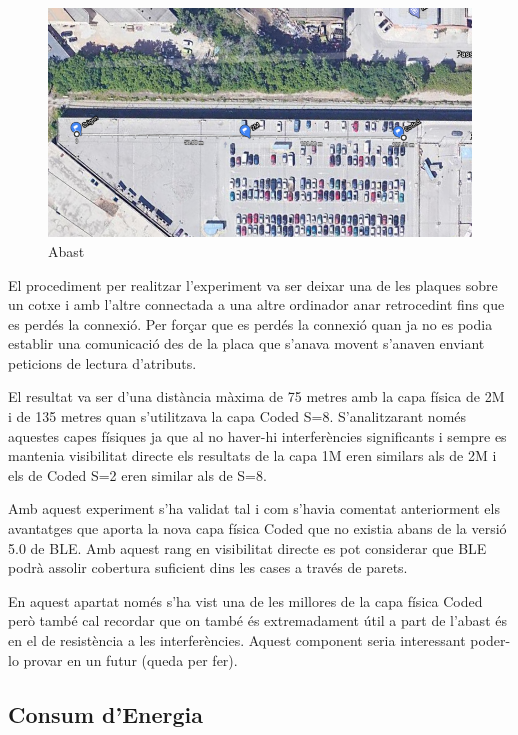 \begin{figure}[!h]
	\begin{center}
		\includegraphics[width=\textwidth]{./images/prova_abast.png}
		\caption{Abast}
	\end{center}
\end{figure}

El procediment per realitzar l'experiment va ser deixar una de les plaques sobre un cotxe i amb l'altre connectada a una altre ordinador anar retrocedint fins que es perdés la connexió.
Per forçar que es perdés la connexió quan ja no es podia establir una comunicació des de la placa que s'anava movent s'anaven enviant peticions de lectura d'atributs.

El resultat va ser d'una distància màxima de 75 metres amb la capa física de 2M i de 135 metres quan s'utilitzava la capa Coded S=8.
S'analitzarant només aquestes capes físiques ja que al no haver-hi interferències significants i sempre es mantenia visibilitat directe els resultats de la capa 1M eren similars als de 2M i els de Coded S=2 eren similar als de S=8.

Amb aquest experiment s'ha validat tal i com s'havia comentat anteriorment els avantatges que aporta la nova capa física Coded que no existia abans de la versió 5.0 de BLE.
Amb aquest rang en visibilitat directe es pot considerar que BLE podrà assolir cobertura suficient dins les cases a través de parets.

En aquest apartat només s'ha vist una de les millores de la capa física Coded però també cal recordar que on també és extremadament útil a part de l'abast és en el de resistència a les interferències.
Aquest component seria interessant poder-lo provar en un futur (queda per fer).


\subsection{Consum d'Energia}

